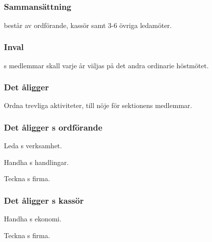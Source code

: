 \subsection{\SEXITFULL}
\subsubsection{Sammansättning}
\SEXIT{} består av ordförande, kassör samt 3-6 övriga ledamöter.

\subsubsection{Inval}
\SEXIT{}s medlemmar skall varje år väljas på det andra ordinarie höstmötet.

\subsubsection{Det åligger \SEXIT}
\begin{att}
	\item Ordna trevliga aktiviteter, till nöje för sektionens medlemmar.
\end{att}

\subsubsection{Det åligger \SEXIT{}s ordförande}
\begin{att}
	\item Leda \SEXIT{}s verksamhet.
	\item Handha \SEXIT{}s handlingar.
	\item Teckna \SEXIT{}s firma.
\end{att}

\subsubsection{Det åligger \SEXIT{}s kassör}
\begin{att}
	\item Handha \SEXIT{}s ekonomi.
	\item Teckna \SEXIT{}s firma.
\end{att}